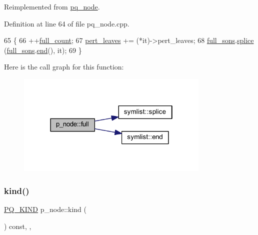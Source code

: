 Reimplemented from \mbox{\hyperlink{classpq__node_af1ba861293e4493dba7cc2c9332fee76}{pq\+\_\+node}}.



Definition at line 64 of file pq\+\_\+node.\+cpp.


\begin{DoxyCode}
65 \{
66     ++\mbox{\hyperlink{classp__node_a67a7570ace6b26d3bcbff7cf71c85cb0}{full\_count}};
67     \mbox{\hyperlink{classpq__node_a3fb78609f93f41efd6826ed3169fc312}{pert\_leaves}} += (*it)->pert\_leaves;
68     \mbox{\hyperlink{classp__node_a09658fb7a7212e51b877444e4cee4378}{full\_sons}}.\mbox{\hyperlink{classsymlist_ac2bd4d9db62ea6a3282662c62a97c3b2}{splice}} (\mbox{\hyperlink{classp__node_a09658fb7a7212e51b877444e4cee4378}{full\_sons}}.\mbox{\hyperlink{classsymlist_a7283589fa01f79d722f8256d7a6a7883}{end}}(), it);
69 \}
\end{DoxyCode}
Here is the call graph for this function\+:\nopagebreak
\begin{figure}[H]
\begin{center}
\leavevmode
\includegraphics[width=262pt]{classp__node_a0ba10aa3a56e26676d78af2e05fb5cd1_cgraph}
\end{center}
\end{figure}
\mbox{\label{classp__node_a58cceed9fc9d92f36ec3fb6425d99cec}} 
\subsubsection{\texorpdfstring{kind()}{kind()}}
{\footnotesize\ttfamily \mbox{\hyperlink{classpq__node_a96827bdca8bf81d20213405dd27f8fa6}{P\+Q\+\_\+\+K\+I\+ND}} p\+\_\+node\+::kind (\begin{DoxyParamCaption}{ }\end{DoxyParamCaption}) const\hspace{0.3cm}{\ttfamily [inline]}, {\ttfamily [private]}, {\ttfamily [virtual]}}



